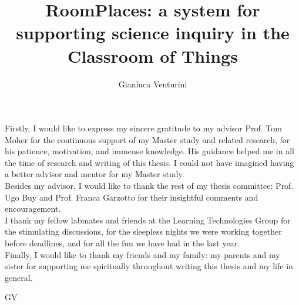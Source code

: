 \documentclass{uicthesi}
\begin{document}

\title{RoomPlaces: a system for supporting science inquiry in the Classroom of Things}
\author{Gianluca Venturini}
\maketitle


\acknowledgements
{Firstly, I would like to express my sincere gratitude to my advisor Prof. Tom Moher for the continuous support of my Master study and related research, for his patience, motivation, and immense knowledge. His guidance helped me in all the time of research and writing of this thesis. I could not have imagined having a better advisor and mentor for my Master study.\\

Besides my advisor, I would like to thank the rest of my thesis committee: Prof. Ugo Buy and Prof. Franca Garzotto for their insightful comments and encouragement.\\

I thank my fellow labmates and friends at the Learning Technologies Group for the stimulating discussions, for the sleepless nights we were working together before deadlines, and for all the fun we have had in the last year.\\

Finally, I would like to thank my friends and my family: my parents and my sister for supporting me spiritually throughout writing this thesis and my life in general.

\begin{flushright}
GV %
\end{flushright}}
\end{document}
